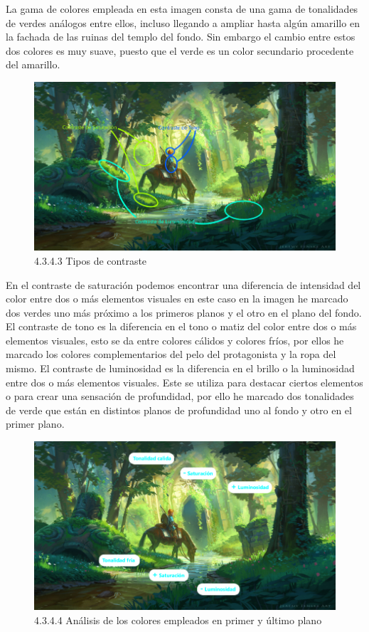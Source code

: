 \documentclass[12pt]{article}
\begin{document}
La gama de colores empleada en esta imagen consta de una gama de tonalidades de verdes análogos entre ellos, incluso llegando a ampliar hasta algún amarillo en la fachada de las ruinas del templo del fondo. Sin embargo el cambio entre estos dos colores es muy suave, puesto que el verde es un color secundario procedente del amarillo.

    \begin{figure}[H]
      \centering
      \includegraphics[width=\textwidth]{images/Saúl/Sección 3/EA_img3_4Color_3Contrastes.png}
      \caption{\small 4.3.4.3 Tipos de contraste}
    \end{figure}

En el contraste de saturación podemos encontrar una diferencia de intensidad del color entre dos o más elementos visuales en este caso en la imagen he marcado dos verdes uno más próximo a los primeros planos y el otro en el plano del fondo. El contraste de tono es la diferencia en el tono o matiz del color entre dos o más elementos visuales, esto se da entre colores cálidos y colores fríos, por ellos he marcado los colores complementarios del pelo del protagonista y la ropa del mismo. El contraste de luminosidad es la diferencia en el brillo o la luminosidad entre dos o más elementos visuales. Este se utiliza para destacar ciertos elementos o para crear una sensación de profundidad, por ello he marcado dos tonalidades de verde que están en distintos planos de profundidad uno al fondo y otro en el primer plano.

    \begin{figure}[H]
      \centering
      \includegraphics[width=\textwidth]{images/Saúl/Sección 3/EA_img3_4Color_4AnalisisPlanosPrimeroFondo.png}
      \caption{\small 4.3.4.4 Análisis de los colores empleados en primer y último plano}
    \end{figure}
\end{document}
